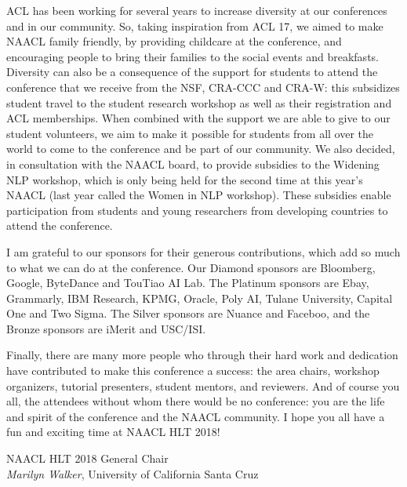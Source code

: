 ACL has been working for several years to increase diversity at our
conferences and in our community. So, taking inspiration from ACL 17,
we aimed to make NAACL family friendly, by providing childcare at the
conference, and encouraging people to bring their families to the
social events and breakfasts. Diversity can also be a consequence of
the support for students to attend the conference that we receive from
the NSF, CRA-CCC and CRA-W: this subsidizes student travel to the student
research workshop as well as their registration and ACL
memberships. When combined with the support we are able to give to our
student volunteers, we aim to make it possible for students from all
over the world to come to the conference and be part of our
community. We also decided, in consultation with the NAACL board, to
provide subsidies to the Widening NLP workshop, which is only being
held for the second time at this year's NAACL (last year called the
Women in NLP workshop).  These subsidies enable participation from
students and young researchers from developing countries to attend the
conference.


I am grateful to our sponsors for their generous contributions, which
add so much to what we can do at the conference.  Our Diamond sponsors
are Bloomberg, Google, ByteDance and TouTiao AI Lab. The Platinum
sponsors are Ebay, Grammarly, IBM Research, KPMG, Oracle, Poly AI,
Tulane University, Capital One and Two Sigma. The Silver sponsors are Nuance and
Faceboo, and the Bronze sponsors are iMerit and USC/ISI.

Finally, there are many more people who through their hard work and
dedication have contributed to make this conference a success: the
area chairs, workshop organizers, tutorial presenters, student
mentors, and reviewers. And of course you all, the attendees without
whom there would be no conference: you are the life and spirit of the
conference and the NAACL community. I hope you all have a
fun and exciting time at NAACL HLT 2018!

\noindent NAACL HLT 2018 General Chair \\
{\it Marilyn Walker}, University of California Santa Cruz 
